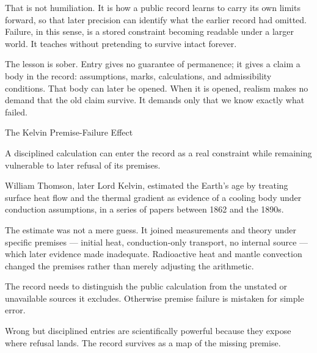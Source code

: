 That is not humiliation. It is how a public record learns to carry its
own limits forward, so that later precision can identify what the
earlier record had omitted. Failure, in this sense, is a stored
constraint becoming readable under a larger world. It teaches without
pretending to survive intact forever.

The lesson is sober. Entry gives no guarantee of permanence; it gives a
claim a body in the record: assumptions, marks, calculations, and
admissibility conditions. That body can later be opened. When it is
opened, realism makes no demand that the old claim survive. It demands
only that we know exactly what failed.

\begin{phenom}{The Kelvin Premise-Failure Effect~\cite{thomson1862secular}}
\label{ph:kelvin-earth-age}

\PhStatement
A disciplined calculation can enter the record as a real constraint while
remaining vulnerable to later refusal of its premises.

\PhOrigin
William Thomson, later Lord Kelvin, estimated the Earth's age by treating
surface heat flow and the thermal gradient as evidence of a cooling body
under conduction assumptions, in a series of papers between 1862 and the
1890s.

\PhObservation
The estimate was not a mere guess. It joined measurements and theory
under specific premises --- initial heat, conduction-only transport,
no internal source --- which later evidence made inadequate. Radioactive
heat and mantle convection changed the premises rather than merely
adjusting the arithmetic.

\PhConstraint
The record needs to distinguish the public calculation from the unstated
or unavailable sources it excludes. Otherwise premise failure is mistaken
for simple error.

\PhConsequence
Wrong but disciplined entries are scientifically powerful because they expose
where refusal lands. The record survives as a map of the missing premise.
\end{phenom}

